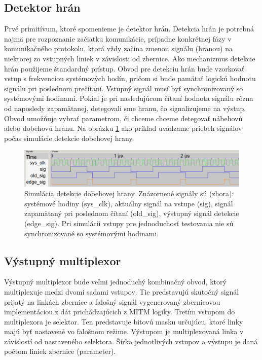 \subsection{Detektor hrán} \label{subsek:edgeDetector}
Prvé primitívum, ktoré spomenieme je detektor hrán. Detekcia hrán je potrebná najmä pre rozpoznanie začiatku komunikácie, prípadne konkrétnej fázy v komunikačného protokolu, ktorá vždy začína zmenou signálu (hranou) na niektorej zo vstupných liniek v závislosti od zbernice. Ako mechanizmus detekcie hrán použijeme štandardný prístup. Obvod pre detekciu hrán bude vzorkovať vstup s frekvenciou systémových hodín, pričom si bude pamätať logickú hodnotu signálu pri poslednom prečítaní. Vstupný signál musí byť synchronizovaný so systémovými hodinami. Pokiaľ je pri nasledujúcom čítaní hodnota signálu rôzna od naposledy zapamätanej, detegovali sme hranu, čo signalizujeme na výstup. Obvod umožňuje vybrať parametrom, či chceme chceme detegovať nábehovú alebo dobehovú hranu. Na obrázku \ref{obr:edgeDetectSim} ako príklad uvádzame priebeh signálov počas simulácie detekcie dobehovej hrany.

\begin{figure}
    \centerline{\includegraphics[width=1\textwidth]{images/simulations/edgeDetectSim.png}}
    \caption[Simulácia detekcie dobehovej hrany]{Simulácia detekcie dobehovej hrany. Znázornené signály sú (zhora): systémové hodiny (sys\_clk), aktuálny signál na vstupe (sig), signál zapamätaný pri poslednom čítaní (old\_sig), výstupný signál detekcie (edge\_sig). Pri simulácii vstupy pre jednoduchosť testovania nie sú synchronizované so systémovými hodinami.}
    \label{obr:edgeDetectSim}
\end{figure}

\subsection{Výstupný multiplexor}\label{subsek:multiplexor}
Výstupný multiplexor bude veľmi jednoduchý kombinačný obvod, ktorý multiplexuje medzi dvomi sadami vstupov. Tie predstavujú skutočný signál prijatý na linkách zbernice a falošný signál vygenerovaný zbernicovou implementáciou z dát prichádzajúcich z MITM logiky. Tretím vstupom do multiplexora je selektor. Ten predstavuje bitovú masku určujúcu, ktoré linky majú byť nastavené vo falošnom režime. Výstupom je multiplexovaná linka v závislostí od nastaveného selektora. Šírka jednotlivých vstupov a výstupu je daná počtom liniek zbernice (parameter).

